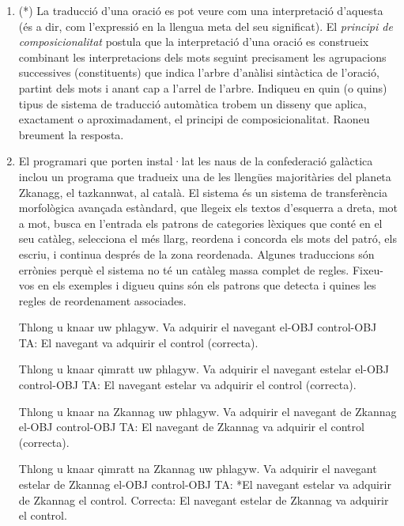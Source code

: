 \begin{enumerate}
\item (*) La traducció d'una oració es pot veure com una interpretació
  d'aquesta (és a dir, com l'expressió en la llengua meta del seu
  significat). El \emph{principi de composicionalitat} postula que la
  interpretació d'una oració es construeix combinant les
  interpretacions dels mots seguint precisament les agrupacions
  successives (constituents) que indica l'arbre d'anàlisi sintàctica
  de l'oració, partint dels mots i anant cap a l'arrel de
  l'arbre. Indiqueu en quin (o quins) tipus de sistema de traducció
  automàtica trobem un disseny que aplica, exactament o
  aproximadament, el principi de composicionalitat. Raoneu breument la
  resposta.
      
\item \label{ex:zkanagg} El programari que porten instal·lat les naus
  de la confederació galàctica inclou un programa que tradueix una de
  les llengües majoritàries del planeta Zkanagg, el tazkannwat, al
  català. El sistema és un sistema de transferència morfològica
  avançada estàndard, que llegeix els textos d'esquerra a dreta, mot a
  mot, busca en l'entrada els patrons de categories lèxiques que conté
  en el seu catàleg, selecciona el més llarg, reordena i concorda els
  mots del patró, els escriu, i continua després de la zona
  reordenada. Algunes traduccions són errònies perquè el sistema no té
  un catàleg massa complet de regles. Fixeu-vos en els exemples i
  digueu quins són els patrons que detecta i quines les regles de
  reordenament associades.
     \begin{example}
     \gll Thlong u knaar uw phlagyw.
          {Va adquirir} el navegant el-OBJ control-OBJ
     \glt TA: El navegant va adquirir el control (correcta).
     \glend
     \end{example}
     \begin{example}
     \gll Thlong u knaar qimratt uw phlagyw.
          {Va adquirir} el navegant estelar el-OBJ control-OBJ
     \glt TA: El navegant estelar va adquirir el control (correcta).
     \glend
     \end{example}
     \begin{example}
     \gll Thlong u knaar na Zkannag uw phlagyw.
          {Va adquirir} el navegant de Zkannag el-OBJ control-OBJ
     \glt TA: El navegant de Zkannag va adquirir el control (correcta).
     \glend
     \end{example}
     \begin{example}
     \gll Thlong u knaar qimratt na Zkannag uw phlagyw.
          {Va adquirir} el navegant estelar de Zkannag el-OBJ control-OBJ
     \glt TA: *El navegant estelar va adquirir de Zkannag el control.
     \glt Correcta: El navegant estelar de Zkannag va adquirir el control.
     \glend
     \end{example}


\end{enumerate}
